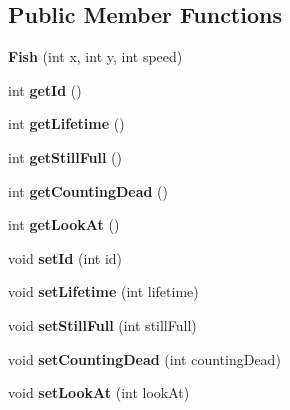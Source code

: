 \subsection*{Public Member Functions}
\begin{DoxyCompactItemize}
\item 
\mbox{\label{class_fish_a1cad2923de843048dab6908d7e11bb00}} 
{\bfseries Fish} (int x, int y, int speed)
\item 
\mbox{\label{class_fish_ac4e2bc7d1c0df07728685ae78d7764b4}} 
int {\bfseries get\+Id} ()
\item 
\mbox{\label{class_fish_af796997e3f6aa164e9c461e4eab54f3b}} 
int {\bfseries get\+Lifetime} ()
\item 
\mbox{\label{class_fish_a2f3e5915d95a6c22bb8290e046e84676}} 
int {\bfseries get\+Still\+Full} ()
\item 
\mbox{\label{class_fish_a5eeb331c3feaf879836138dc423a29a7}} 
int {\bfseries get\+Counting\+Dead} ()
\item 
\mbox{\label{class_fish_a5ff69256c70ab85c6cfefa7767116c63}} 
int {\bfseries get\+Look\+At} ()
\item 
\mbox{\label{class_fish_a318f36bb4023d32c93f1c31ba6714157}} 
void {\bfseries set\+Id} (int id)
\item 
\mbox{\label{class_fish_ad7e9032a5f826714df0d9b644fb11a8a}} 
void {\bfseries set\+Lifetime} (int lifetime)
\item 
\mbox{\label{class_fish_a6c7ce1e1489f4cac6fbf2218af198585}} 
void {\bfseries set\+Still\+Full} (int still\+Full)
\item 
\mbox{\label{class_fish_ab8aab50eb6109450eb478149b1aa0b62}} 
void {\bfseries set\+Counting\+Dead} (int counting\+Dead)
\item 
\mbox{\label{class_fish_a8bcf2c1da07a83c9c3964e3550434f80}} 
void {\bfseries set\+Look\+At} (int look\+At)
\item 
\mbox{\label{class_fish_adb64e0ebd369fa4e8d6103cb46362e4b}} 

\end{DoxyCompactItemize}
